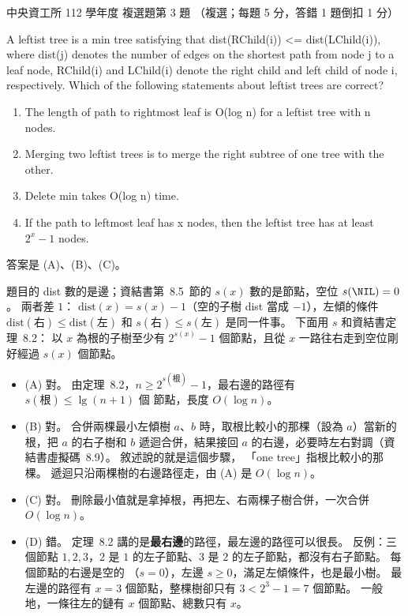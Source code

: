 \begin{pastexam}[label={px:ncu-112-dsa-03}]{中央資工所 112 學年度 複選題第 3 題}
（複選；每題 5 分，答錯 1 題倒扣 1 分）

A leftist tree is a min tree satisfying that dist(RChild(i)) <= dist(LChild(i)), where dist(j)
denotes the number of edges on the shortest path from node j to a leaf node, RChild(i) and LChild(i)
denote the right child and left child of node i, respectively. Which of the following statements about
leftist trees are correct?
\begin{enumerate}[label=(\Alph*)]
\item The length of path to rightmost leaf is O(log n) for a leftist tree with n nodes.
\item Merging two leftist trees is to merge the right subtree of one tree with the other.
\item Delete min takes O(log n) time.
\item If the path to leftmost leaf has x nodes, then the leftist tree has at least $2^x-1$ nodes.
\end{enumerate}
\end{pastexam}

\begin{pastsoln}
答案是 (A)、(B)、(C)。

題目的 dist 數的是邊；資結書第~8.5~節的 $s(x)$ 數的是節點，空位 $s(\NIL) = 0$。 兩者差 $1$：
$\mathrm{dist}(x) = s(x) - 1$（空的子樹 dist 當成 $-1$），左傾的條件 $\mathrm{dist}(\text{右}) \le
\mathrm{dist}(\text{左})$ 和 $s(\text{右}) \le s(\text{左})$ 是同一件事。 下面用 $s$ 和資結書定理~8.2：
以 $x$ 為根的子樹至少有 $2^{s(x)} - 1$ 個節點，且從 $x$ 一路往右走到空位剛好經過 $s(x)$ 個節點。
\begin{itemize}
\item (A) 對。 由定理~8.2，$n \ge 2^{s(\text{根})} - 1$，最右邊的路徑有 $s(\text{根}) \le \lg(n + 1)$ 個
節點，長度 $O(\log n)$。
\item (B) 對。 合併兩棵最小左傾樹 $a$、$b$ 時，取根比較小的那棵（設為 $a$）當新的根，把 $a$ 的右子樹和
$b$ 遞迴合併，結果接回 $a$ 的右邊，必要時左右對調（資結書虛擬碼~8.9）。 敘述說的就是這個步驟，
「one tree」指根比較小的那棵。 遞迴只沿兩棵樹的右邊路徑走，由 (A) 是 $O(\log n)$。
\item (C) 對。 刪除最小值就是拿掉根，再把左、右兩棵子樹合併，一次合併 $O(\log n)$。
\item (D) 錯。 定理~8.2 講的是\textbf{最右邊}的路徑，最左邊的路徑可以很長。 反例：三個節點
$1, 2, 3$，$2$ 是 $1$ 的左子節點、$3$ 是 $2$ 的左子節點，都沒有右子節點。 每個節點的右邊是空的
（$s = 0$），左邊 $s \ge 0$，滿足左傾條件，也是最小樹。 最左邊的路徑有 $x = 3$ 個節點，整棵樹卻只有
$3 < 2^3 - 1 = 7$ 個節點。 一般地，一條往左的鏈有 $x$ 個節點、總數只有 $x$。
\end{itemize}
\end{pastsoln}
